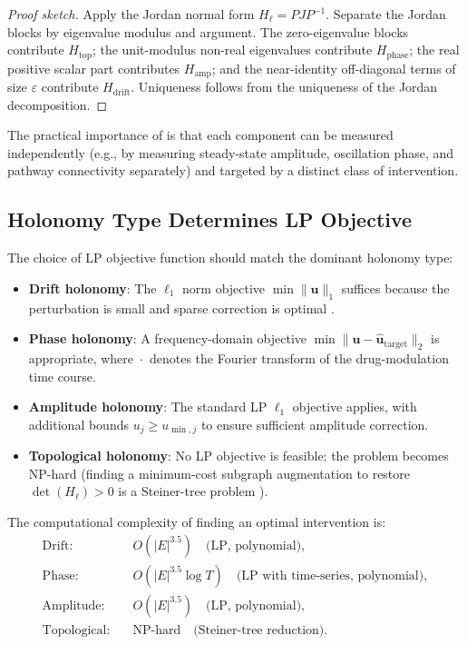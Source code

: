 \begin{proof}[Proof sketch]
Apply the Jordan normal form $H_\ell = P J P^{-1}$.  Separate the Jordan
blocks by eigenvalue modulus and argument.  The zero-eigenvalue blocks
contribute $H_{\mathrm{top}}$; the unit-modulus non-real eigenvalues contribute
$H_{\mathrm{phase}}$; the real positive scalar part contributes $H_{\mathrm{amp}}$;
and the near-identity off-diagonal terms of size $\varepsilon$ contribute
$H_{\mathrm{drift}}$.  Uniqueness follows from the uniqueness of the Jordan
decomposition.
\end{proof}

The practical importance of  is that each component
can be measured independently (e.g., by measuring steady-state amplitude,
oscillation phase, and pathway connectivity separately) and targeted by a
distinct class of intervention.

\subsection{Holonomy Type Determines LP Objective}

The choice of LP objective function should match the dominant holonomy type:

\begin{itemize}
  \item \textbf{Drift holonomy}: The $\ell_1$ norm objective
        $\min \|\mathbf{u}\|_1$ suffices because the perturbation is small and
        sparse correction is optimal \citep{Tibshirani1996}.
  \item \textbf{Phase holonomy}: A frequency-domain objective
        $\min \|\hat{\mathbf{u}} - \hat{\mathbf{u}}_{\mathrm{target}}\|_2$ is
        appropriate, where $\hat{\cdot}$ denotes the Fourier transform of the
        drug-modulation time course.
  \item \textbf{Amplitude holonomy}: The standard LP $\ell_1$ objective applies,
        with additional bounds $u_j \geq u_{\min,j}$ to ensure sufficient
        amplitude correction.
  \item \textbf{Topological holonomy}: No LP objective is feasible;
        the problem becomes NP-hard (finding a minimum-cost subgraph augmentation
        to restore $\det(H_\ell) > 0$ is a Steiner-tree problem
        \citep{Karp1972}).
\end{itemize}

\begin{corollary}
\label{cor:ch10-complexity}
The computational complexity of finding an optimal intervention is:
\begin{align*}
  \text{Drift:} & \quad O(|E|^{3.5}) \quad \text{(LP, polynomial)}, \\
  \text{Phase:} & \quad O(|E|^{3.5} \log T) \quad \text{(LP with time-series, polynomial)}, \\
  \text{Amplitude:} & \quad O(|E|^{3.5}) \quad \text{(LP, polynomial)}, \\
  \text{Topological:} & \quad \mathrm{NP\text{-}hard} \quad \text{(Steiner-tree reduction)}.
\end{align*}
\end{corollary}

